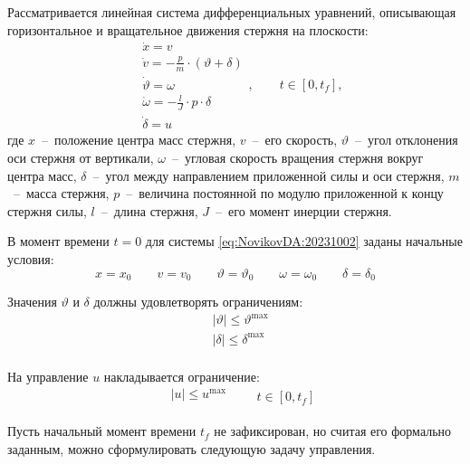 Рассматривается линейная система дифференциальных уравнений, описывающая горизонтальное и вращательное движения стержня на плоскости:
\begin{equation}\label{eq:NovikovDA:20231002}
\begin{aligned}
	&\dot x=v \\
	&\dot{v}=-\frac{p}{m}\cdot (\vartheta+\delta) \\
	&\dot{\vartheta}=\omega \\
	&\dot{\omega}=-\frac{l}{J}\cdot p\cdot \delta \\
	&\dot \delta = u
\end{aligned},
\qquad t\in [0,t_f],
\end{equation}
где $x$~--~положение центра масс стержня, $v$~--~его скорость,  $\vartheta$~--~угол отклонения оси стержня от вертикали,  $\omega$~--~угловая скорость вращения стержня вокруг центра масс, $\delta$~--~угол между направлением приложенной силы и оси стержня, $m$~--~масса стержня, $p$~--~величина постоянной по модулю приложенной к концу стержня силы, $l$~--~длина стержня, $J$~--~его момент инерции стержня.

В момент времени $t=0$ для системы \eqref{eq:NovikovDA:20231002} заданы начальные условия: 
\begin{equation}\label{eq:NovikovDA:202310051}
	x=x_0 \qquad v=v_0 \qquad  \vartheta=\vartheta_0  \qquad\omega=\omega_0 \qquad \delta=\delta_0
\end{equation}

Значения $\vartheta$ и $\delta$ должны удовлетворять ограничениям:
\begin{equation}\label{eq:NovikovDA:202310021}	
	\begin{aligned}
		&|\vartheta| \leq \vartheta^{\max}\\
		&|\delta| \leq \delta^{\max} \\	
	\end{aligned}
\end{equation}

На управление $u$ накладывается ограничение:
\begin{equation}\label{eq:NovikovDA:202310022}
	\begin{aligned}
		&|u| \leq u^{\max}\\
	\end{aligned}
	\qquad t\in [0,t_f]
\end{equation}

Пусть начальный момент времени $t_f$ не зафиксирован, но считая его формально заданным, можно сформулировать следующую задачу управления.

